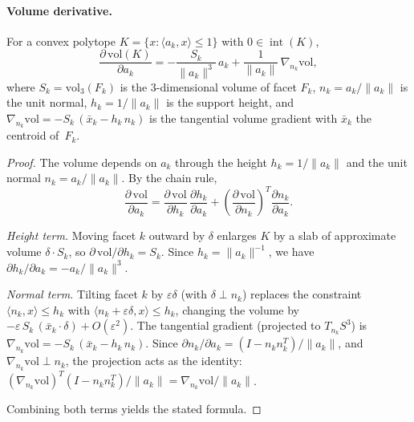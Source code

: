 \paragraph{Volume derivative.}

\begin{unverified}
\begin{lemma}
\label{lem:vol-derivative}
For a convex polytope $K = \{x : \langle a_k, x \rangle \le 1\}$ with
$0 \in \operatorname{int}(K)$,
\[
  \frac{\partial\,\mathrm{vol}(K)}{\partial a_k}
  = -\frac{S_k}{\|a_k\|^3}\,a_k
    + \frac{1}{\|a_k\|}\,\nabla_{n_k}\mathrm{vol},
\]
where $S_k = \mathrm{vol}_3(F_k)$ is the $3$-dimensional volume of facet
$F_k$, $n_k = a_k/\|a_k\|$ is the unit normal, $h_k = 1/\|a_k\|$ is the
support height, and
$\nabla_{n_k}\mathrm{vol} = -S_k\,(\bar{x}_k - h_k\,n_k)$
is the tangential volume gradient with $\bar{x}_k$ the centroid of~$F_k$.
\end{lemma}

\begin{proof}
The volume depends on $a_k$ through the height $h_k = 1/\|a_k\|$ and
the unit normal $n_k = a_k/\|a_k\|$.  By the chain rule,
\[
  \frac{\partial\,\mathrm{vol}}{\partial a_k}
  = \frac{\partial\,\mathrm{vol}}{\partial h_k}\,
    \frac{\partial h_k}{\partial a_k}
  + \left(\frac{\partial\,\mathrm{vol}}{\partial n_k}\right)^{\!T}
    \frac{\partial n_k}{\partial a_k}.
\]

\emph{Height term.}
Moving facet $k$ outward by $\delta$ enlarges $K$ by a slab of
approximate volume $\delta \cdot S_k$, so
$\partial\,\mathrm{vol}/\partial h_k = S_k$.
Since $h_k = \|a_k\|^{-1}$, we have
$\partial h_k/\partial a_k = -a_k/\|a_k\|^3$.

\emph{Normal term.}
Tilting facet $k$ by $\varepsilon\delta$ (with $\delta \perp n_k$)
replaces the constraint $\langle n_k, x \rangle \le h_k$ with
$\langle n_k + \varepsilon\delta, x \rangle \le h_k$, changing the volume by
$-\varepsilon\,S_k\,(\bar{x}_k \cdot \delta) + O(\varepsilon^2)$.
The tangential gradient (projected to $T_{n_k}S^3$) is
$\nabla_{n_k}\mathrm{vol} = -S_k\,(\bar{x}_k - h_k\,n_k)$.
Since $\partial n_k/\partial a_k = (I - n_k n_k^T)/\|a_k\|$, and
$\nabla_{n_k}\mathrm{vol} \perp n_k$, the projection acts as the identity:
$(\nabla_{n_k}\mathrm{vol})^T (I - n_k n_k^T)/\|a_k\|
= \nabla_{n_k}\mathrm{vol} / \|a_k\|$.

Combining both terms yields the stated formula.
\end{proof}
\end{unverified}

